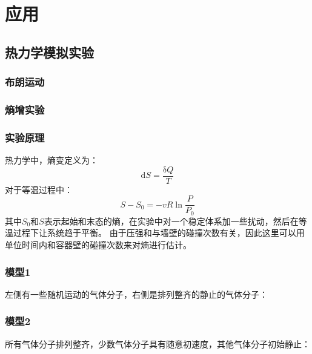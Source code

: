 ﻿\documentclass{article}
\begin{document}
	\section{应用}
	\subsection{热力学模拟实验}
	\subsubsection{布朗运动}
	\subsubsection{熵增实验}
	\subsubsection*{实验原理}
	热力学中，熵变定义为：
	\[\mathrm{d}S = \frac{\mathrm{\delta}Q}{T}\]
	对于等温过程中：
	\[S - S_0 = -vR\ln\frac{P}{P_0}\]
	其中$S_0$和$S$表示起始和末态的熵，在实验中对一个稳定体系加一些扰动，然后在等温过程下让系统趋于平衡。
	由于压强和与墙壁的碰撞次数有关，因此这里可以用单位时间内和容器壁的碰撞次数来对熵进行估计。
	\subsubsection*{模型1}
	左侧有一些随机运动的气体分子，右侧是排列整齐的静止的气体分子：
	\begin{figure}[H]
	\end{figure}
	\subsubsection*{模型2}
	所有气体分子排列整齐，少数气体分子具有随意初速度，其他气体分子初始静止：
	\begin{figure}[H]
	\end{figure}
\end{document}
